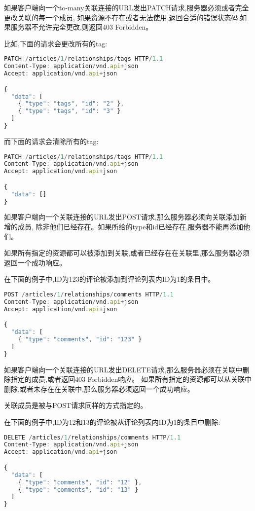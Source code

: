 如果客户端向一个to-many关联连接的URL发出PATCH请求,服务器必须或者完全更改关联的每一个成员, 如果资源不存在或者无法使用,返回合适的错误状态码,如果服务器不允许完全更改,则返回403 Forbidden。

比如,下面的请求会更改所有的tag:

\begin{lstlisting}[language=JavaScript]
PATCH /articles/1/relationships/tags HTTP/1.1
Content-Type: application/vnd.api+json
Accept: application/vnd.api+json

{
  "data": [
    { "type": "tags", "id": "2" },
    { "type": "tags", "id": "3" }
  ]
}
\end{lstlisting}


而下面的请求会清除所有的tag:



\begin{lstlisting}[language=JavaScript]
PATCH /articles/1/relationships/tags HTTP/1.1
Content-Type: application/vnd.api+json
Accept: application/vnd.api+json

{
  "data": []
}
\end{lstlisting}


如果客户端向一个关联连接的URL发出POST请求,那么服务器必须向关联添加新增的成员, 除非他们已经存在。如果所给的type和id已经存在,服务器不能再添加他们。

如果所有指定的资源都可以被添加到关联,或者已经存在在关联里,那么服务器必须返回一个成功响应。

在下面的例子中,ID为123的评论被添加到评论列表内ID为1的条目中。

\begin{lstlisting}[language=JavaScript]
POST /articles/1/relationships/comments HTTP/1.1
Content-Type: application/vnd.api+json
Accept: application/vnd.api+json

{
  "data": [
    { "type": "comments", "id": "123" }
  ]
}
\end{lstlisting}

如果客户端向一个关联连接的URL发出DELETE请求,那么服务器必须在关联中删除指定的成员,或者返回403 Forbidden响应。 如果所有指定的资源都可以从关联中删除,或者未存在在关联中,那么服务器必须返回一个成功响应。

关联成员是被与POST请求同样的方式指定的。

在下面的例子中,ID为12和13的评论被从评论列表内ID为1的条目中删除:



\begin{lstlisting}[language=JavaScript]
DELETE /articles/1/relationships/comments HTTP/1.1
Content-Type: application/vnd.api+json
Accept: application/vnd.api+json

{
  "data": [
    { "type": "comments", "id": "12" },
    { "type": "comments", "id": "13" }
  ]
}
\end{lstlisting}


